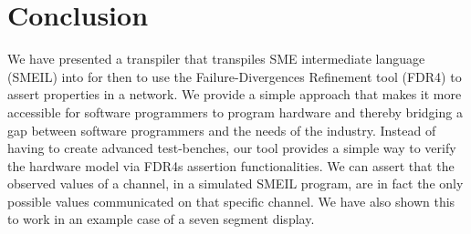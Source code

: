 
\chapter{Conclusion}
We have presented a transpiler that transpiles SME intermediate language (SMEIL) into \cspm{} for then to use the Failure-Divergences Refinement tool (FDR4) to assert properties in a \cspm{} network. We provide a simple approach that makes it more accessible for software programmers to program hardware and thereby bridging a gap between software programmers and the needs of the industry.
Instead of having to create advanced test-benches, our tool provides a simple way to verify the hardware model via FDR4s assertion functionalities. We can assert that the observed values of a channel, in a simulated SMEIL program, are in fact the only possible values communicated on that specific channel. We have also shown this to work in an example case of a seven segment display.
